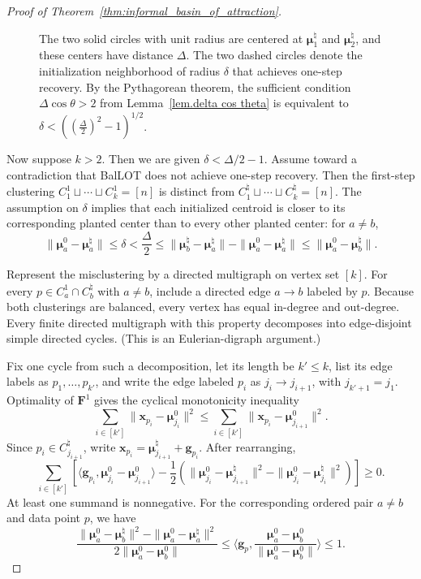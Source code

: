 \documentclass{article}
\theoremstyle{plain}
\theoremstyle{definition}
\newcommand{\1}{\mathbf{1}}
\newcommand{\bmF}{\bm{F}}
\newcommand{\bmu}{\bm{\mu}}
\begin{document}
\begin{proof}[Proof of Theorem~\ref{thm:informal_basin_of_attraction}]
\begin{figure}[t]
    \caption{The two solid circles with unit radius are centered at $\bmu^{\natural}_1$ and $\bmu^{\natural}_2$, and these centers have distance $\Delta$. The two dashed circles denote the initialization neighborhood of radius $\delta$ that achieves one-step recovery. By the Pythagorean theorem, the sufficient condition $\Delta\cos\theta > 2$ from Lemma~\ref{lem.delta cos theta} is equivalent to $\delta < ((\frac{\Delta}{2})^2 - 1)^{1/2}$.}
    \label{fig:visualize_k=2}
\end{figure}

Now suppose $k>2$.
Then we are given $\delta<\Delta/2-1$.
Assume toward a contradiction that BalLOT does not achieve one-step recovery.
Then the first-step clustering $C_1^1\sqcup\cdots\sqcup C_k^1=[n]$ is distinct from $C_1^\natural \sqcup\cdots\sqcup C_k^\natural=[n]$.
The assumption on $\delta$ implies that each initialized centroid is closer to its corresponding planted center than to every other planted center: for $a\neq b$,
\[
\|\bmu_a^0-\bmu^{\natural}_a\|
\leq\delta
<\frac{\Delta}{2}
\leq\|\bmu^{\natural}_b-\bmu^{\natural}_a\|-\|\bmu_a^0-\bmu^{\natural}_a\|
\leq\|\bmu_a^0-\bmu^{\natural}_b\|.
\]

Represent the misclustering by a directed multigraph on vertex set $[k]$.
For every $p\in C_a^1\cap C_b^\natural$ with $a\neq b$, include a directed edge $a\to b$ labeled by $p$.
Because both clusterings are balanced, every vertex has equal in-degree and out-degree.
Every finite directed multigraph with this property decomposes into edge-disjoint simple directed cycles.
(This is an Eulerian-digraph argument.)

Fix one cycle from such a decomposition, let its length be $k'\leq k$, list its edge labels as $p_1,\ldots,p_{k'}$, and write the edge labeled $p_i$ as $j_i\to j_{i+1}$, with $j_{k'+1}=j_1$.
Optimality of $\bmF^1$ gives the cyclical monotonicity inequality
\[
\sum_{i\in[k']}\|\bm{x}_{p_i}-\bmu_{j_i}^0\|^2
\leq
\sum_{i\in[k']}\|\bm{x}_{p_i}-\bmu_{j_{i+1}}^0\|^2.
\]
Since $p_i\in C_{j_{i+1}}^\natural$, write $\bm{x}_{p_i}=\bmu^{\natural}_{j_{i+1}}+\bm{g}_{p_i}$.
After rearranging,
\[
\sum_{i\in[k']}
\left[
\langle\bm{g}_{p_i},\bmu_{j_i}^0-\bmu_{j_{i+1}}^0\rangle
-
\frac{1}{2}
\left(
\|\bmu_{j_i}^0-\bmu^\natural_{j_{i+1}}\|^2
-
\|\bmu_{j_i}^0-\bmu^\natural_{j_i}\|^2
\right)
\right]
\geq0.
\]
At least one summand is nonnegative.
For the corresponding ordered pair $a\neq b$ and data point $p$, we have
\begin{equation}
\label{eq: cycle necessary inequality}
\frac{\|\bmu_a^0-\bmu^\natural_b\|^2-\|\bmu_a^0-\bmu^\natural_a\|^2}
{2\|\bmu_a^0-\bmu_b^0\|}
\leq
\bigg\langle\bm{g}_p,
\frac{\bmu_a^0-\bmu_b^0}{\|\bmu_a^0-\bmu_b^0\|}\bigg\rangle
\leq1.
\end{equation}


\end{proof}
\end{document}
